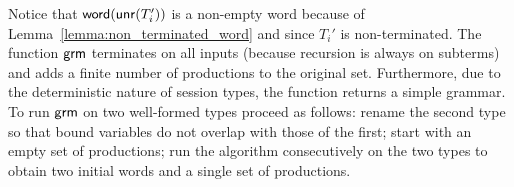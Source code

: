 
%

Notice that $\mathsf{word}(\mathsf{unr}(T_i'))$ is a non-empty word because of
Lemma~\ref{lemma:non_terminated_word} and since $T_i'$ is 
non-terminated.
The function $\mathsf{grm}$ terminates on all inputs (because recursion is
always on subterms) and adds a finite number of productions to the
original set. Furthermore, due to the deterministic nature of session
types, the function returns a simple grammar.
%
To run $\mathsf{grm}$ on two well-formed types proceed as follows: rename the
second type so that bound variables do not overlap with those of the
first; start with an empty set of productions; run the algorithm
consecutively on the two types to obtain two initial words and a
single set of productions.

